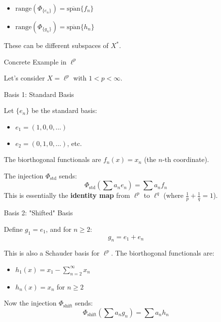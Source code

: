 \documentclass[aps,preprint]{revtex4}
\newenvironment{answer}
  {\begin{tcolorbox}[colback=green!5!white,colframe=green!75!black,title=Answer]}
  {\end{tcolorbox}}
\begin{document}
\begin{answer}
\begin{itemize}
\item $\text{range}(\Phi_{\{e_n\}}) = \overline{\text{span}}\{f_n\}$

\item $\text{range}(\Phi_{\{g_n\}}) = \overline{\text{span}}\{h_n\}$
\end{itemize}

These can be different subspaces of $X^*$.

Concrete Example in $\ell^p$

Let's consider $X = \ell^p$ with $1 < p < \infty$.

Basis 1: Standard Basis

Let $\{e_n\}$ be the standard basis:

\begin{itemize}
\item $e_1 = (1,0,0,\dots)$

\item $e_2 = (0,1,0,\dots)$, etc.
\end{itemize}

The biorthogonal functionals are $f_n(x) = x_n$ (the $n$-th coordinate).

The injection $\Phi_{\text{std}}$ sends: 
\begin{equation*}
\Phi_{\text{std}}\left(\sum a_n e_n\right) = \sum a_n f_n
\end{equation*}
This is essentially the \textbf{identity map} from $\ell^p$ to $\ell^q$
(where $\frac{1}{p} + \frac{1}{q} = 1$).

Basis 2: "Shifted" Basis

Define $g_1 = e_1$, and for $n \geq 2$: 
\begin{equation*}
g_n = e_1 + e_n
\end{equation*}

This is also a Schauder basis for $\ell^p$. The biorthogonal functionals are:

\begin{itemize}
\item $h_1(x) = x_1 - \sum_{n=2}^\infty x_n$

\item $h_n(x) = x_n$ for $n \geq 2$
\end{itemize}

Now the injection $\Phi_{\text{shift}}$ sends: 
\begin{equation*}
\Phi_{\text{shift}}\left(\sum a_n g_n\right) = \sum a_n h_n
\end{equation*}


\end{answer}
\end{document}

